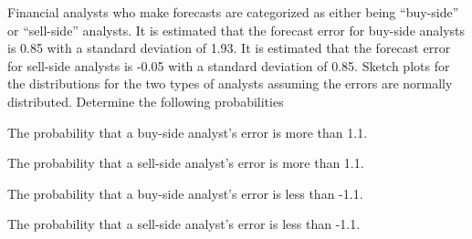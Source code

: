 \begin{problem}
    \clearpage

\item Financial analysts who make forecasts are categorized as either
  being ``buy-side'' or ``sell-side'' analysts. It is estimated that
  the forecast error for buy-side analysts is 0.85 with a standard
  deviation of 1.93. It is estimated that the forecast error for
  sell-side analysts is -0.05 with a standard deviation of
  0.85. Sketch plots for the distributions for the two types of
  analysts assuming the errors are normally distributed.  Determine
  the following probabilities

  \begin{subproblem}
    \item The probability that a buy-side analyst's error is more than
      1.1.
      \vfill
    \item The probability that a sell-side analyst's error is more than
      1.1.
      \vfill
    \item The probability that a buy-side analyst's error is less than
      -1.1.
      \vfill
    \item The probability that a sell-side analyst's error is less than
      -1.1.
      \vfill
  \end{subproblem}



  
\end{problem}

